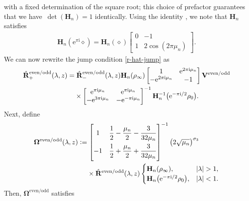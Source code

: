 \documentclass[pdftex]{sigma}
\numberwithin{equation}{section}
\newcommand{\ee}{\mathrm{e}}
\newcommand{\ii}{\mathrm{i}}
\begin{document}
with a fixed determination of the square root; this choice of prefactor guarantees that we have~$\det (\mathbf{H}_n ) = 1$ identically. Using the identity \cite[equation~(10.11.4)]{DLMF}, we note that $\mathbf{H}_n$ satisfies
\begin{gather}
\label{Bn-jump}
\mathbf{H}_n(\ee^{\pi \ii}\diamond) = \mathbf{H}_n(\diamond) \begin{bmatrix}
0 & -1 \\ 1 & 2\cos(2\pi \mu_n)
\end{bmatrix}.
\end{gather}
We can now rewrite the jump condition \eqref{r-hat-jump} as
\begin{align*}
 &\hat{\mathbf{R}}^\mathrm{even/odd}_+(\lambda,z)= \hat{\mathbf{R}}^\mathrm{even/odd}_-(\lambda,z) \mathbf{H}_n(\rho_\infty) \begin{bmatrix} 1 & \ee^{2\pi \ii \mu_n} \\ -\ee^{2\pi \ii \mu_n} & -1 \end{bmatrix} \mathbf{V}^\mathrm{even/odd}\\
 & \hphantom{\hat{\mathbf{R}}^\mathrm{even/odd}_+(\lambda,z)=}{}
 \times \begin{bmatrix} \ee^{\pi \ii \mu_n}& \ee^{\pi \ii \mu_n}\\ - \ee^{3\pi \ii \mu_n} & - \ee^{-\pi \ii \mu_n} \end{bmatrix}^{-1} \mathbf{H}_n^{-1}\big(\ee^{-\pi \ii/2}\rho_0\big).
\end{align*}
Next, define
\begin{align}
 & \mathbf{\Omega}^\mathrm{even/odd} (\lambda, z) := \begin{bmatrix} 1 & \dfrac{1}{2} - \dfrac{\mu_n}{2} - \dfrac{3}{32\mu_n} \vspace{1.5mm}\\ -1 & \dfrac{1}{2} + \dfrac{\mu_n}{2} + \dfrac{3}{32\mu_n} \end{bmatrix}^{-1} \big(2\sqrt{\mu_n}\big)^{\sigma_3}\nonumber\\
 &\hphantom{\mathbf{\Omega}^\mathrm{even/odd} (\lambda, z) :=}{}
 \times\hat{\mathbf{R}}^\mathrm{even/odd}(\lambda, z) \begin{cases}
 \mathbf{H}_n(\rho_\infty), & |\lambda| >1, \\
 \mathbf{H}_n\big(\ee^{-\pi \ii/2}\rho_0\big), & |\lambda| < 1.
 \end{cases}
 \label{eq:Omega-def}
\end{align}
Then, $\mathbf{\Omega}^\mathrm{even/odd}$ satisfies
\end{document}
